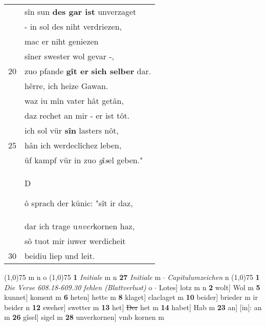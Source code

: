 \documentclass[8pt,a4paper,notitlepage]{article}
\begin{document}
\begin{table}[ht]
\begin{minipage}[t]{0.5\linewidth}
\begin{tabular}{rl}
 & sîn sun \textbf{des gar ist} unverzaget\\ 
 & - in sol des niht verdriezen,\\ 
 & mac er niht geniezen\\ 
 & sîner swester wol gevar -,\\ 
20 & zuo pfande \textbf{gît er} \textbf{sich selber} dar.\\ 
 & hêrre, ich heize Gawan.\\ 
 & waz iu mîn vater hât getân,\\ 
 & daz rechet an mir - er ist tôt.\\ 
 & ich sol vür \textbf{sîn} lasters nôt,\\ 
25 & hân ich werdeclîchez leben,\\ 
 & ûf kampf vür in zuo \textit{g}î\textit{s}el geben."\\ 
 & \begin{large}D\end{large}ô sprach der künic: "sît ir daz,\\ 
 & dar ich trage u\textit{nver}kornen haz,\\ 
 & sô tuot mir iuwer werdicheit\\ 
30 & beidiu liep und leit.\\ 
\end{tabular}
\scriptsize
\line(1,0){75} \newline
m n o \newline
\line(1,0){75} \newline
\textbf{1} \textit{Initiale} m n  \textbf{27} \textit{Initiale} m   $\cdot$ \textit{Capitulumzeichen} n  \newline
\line(1,0){75} \newline
\textbf{1} \textit{Die Verse 608.18-609.30 fehlen (Blattverlust)} o   $\cdot$ Lotes] lotz m n \textbf{2} wolt] Wol m \textbf{5} kunnet] koment m \textbf{6} heten] hette m \textbf{8} klaget] claclaget m \textbf{10} beider] brieder m ir beider n \textbf{12} sweher] swetter m \textbf{13} het] \sout{Der} het m \textbf{14} habet] Hab m \textbf{23} an] [in]: an m \textbf{26} gîsel] sigel m \textbf{28} unverkornen] vmb kornen m \newline
\end{minipage}
\end{table}
\newpage
\end{document}
